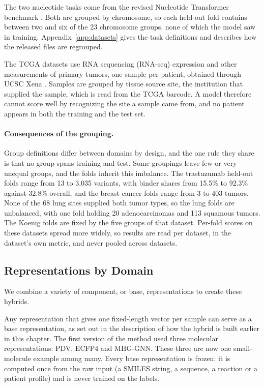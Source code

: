 The two nucleotide tasks come from the revised Nucleotide Transformer benchmark \citep{DallaTorre2025}. Both are grouped by chromosome, so each held-out fold contains between two and six of the 23 chromosome groups, none of which the model saw in training. Appendix~\ref{app:datasets} gives the task definitions and describes how the released files are regrouped.

The TCGA datasets use RNA sequencing (RNA-seq) expression and other measurements of primary tumors, one sample per patient, obtained through UCSC Xena \citep{Goldman2020}. Samples are grouped by tissue source site, the institution that supplied the sample, which is read from the TCGA barcode. A model therefore cannot score well by recognizing the site a sample came from, and no patient appears in both the training and the test set.

\paragraph{Consequences of the grouping.} Group definitions differ between domains by design, and the one rule they share is that no group spans training and test. Some groupings leave few or very unequal groups, and the folds inherit this imbalance. The trastuzumab held-out folds range from 13 to 3,035 variants, with binder shares from 15.5\% to 92.3\% against 32.8\% overall, and the breast cancer folds range from 3 to 403 tumors. None of the 68 lung sites supplied both tumor types, so the lung folds are unbalanced, with one fold holding 20 adenocarcinomas and 113 squamous tumors. The Koenig folds are fixed by the five groups of that dataset. Per-fold scores on these datasets spread more widely, so results are read per dataset, in the dataset's own metric, and never pooled across datasets.
\subsection{Representations by Domain}

We combine a variety of component, or base, representations to create these hybrids.

Any representation that gives one fixed-length vector per sample can serve as a base representation, as set out in the description of how the hybrid is built earlier in this chapter. The first version of the method used three molecular representations: PDV, ECFP4 and MHG-GNN. These three are now one small-molecule example among many. Every base representation is frozen: it is computed once from the raw input (a SMILES string, a sequence, a reaction or a patient profile) and is never trained on the labels.

